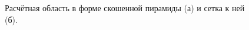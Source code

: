 \begin{figure}
	\begin{minipage}[h]{0.49\linewidth}
	\end{minipage}
	\hfill
	\begin{minipage}[h]{0.49\linewidth}
	\end{minipage}
	\caption{Расчётная область в форме скошенной пирамиды (а) и сетка к ней (б).}
	\label{fig:Pyramid}
\end{figure}

